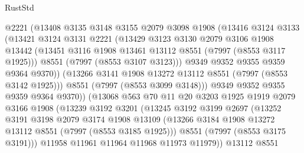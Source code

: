 \begin{lexlean}{RustStd}
\begin{coremodule}
{\begin{coremodule}
{{{{{{{{{{{{{{{{{{{{{{{{{{{{{{{{{{{{{{{{{{{                      @2221
                      (@13408
                        @3135
                        @3148
                        @3155
                        @2079
                        @3098
                        @1908
                        (@13416
                          @3124
                          @3133
                          (@13421
                            @3124
                            @3131
                            @2221
                            (@13429
                              @3123
                              @3130
                              @2079
                              @3106
                              @1908
                              @13442
                              (@13451 @3116 @1908 @13461 @13112 @8551 (@7997 (@8553 @3117 @1925)))
                              @8551
                              (@7997 (@8553 @3107 @3123)))
                            @9349
                            @9352
                            @9355
                            @9359
                            @9364
                            @9370))
                        (@13266 @3141 @1908 @13272 @13112 @8551 (@7997 (@8553 @3142 @1925)))
                        @8551
                        (@7997 (@8553 @3099 @3148)))
                      @9349
                      @9352
                      @9355
                      @9359
                      @9364
                      @9370))
                  (@13068
                    @563
                    @70
                    @11
                    @20
                    @3203
                    @1925
                    @1919
                    @2079
                    @3166
                    @1908
                    (@13239
                      @3192
                      @3201
                      (@13245
                        @3192
                        @3199
                        @2697
                        (@13252
                          @3191
                          @3198
                          @2079
                          @3174
                          @1908
                          @13109
                          (@13266 @3184 @1908 @13272 @13112 @8551 (@7997 (@8553 @3185 @1925)))
                          @8551
                          (@7997 (@8553 @3175 @3191)))
                        @11958
                        @11961
                        @11964
                        @11968
                        @11973
                        @11979))
                    @13112
                    @8551
}}}}}}}}}}}}}}}}}}}}}}}}}}}}}}}}}}}}}}}}}}}
\end{coremodule}}
\end{coremodule}
\end{lexlean}
